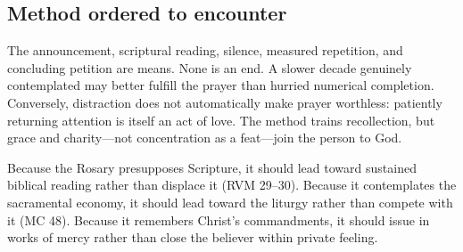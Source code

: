\subsection{Method ordered to encounter}

The announcement, scriptural reading, silence, measured repetition, and concluding petition are means. None is an end. A slower decade genuinely contemplated may better fulfill the prayer than hurried numerical completion. Conversely, distraction does not automatically make prayer worthless: patiently returning attention is itself an act of love. The method trains recollection, but grace and charity---not concentration as a feat---join the person to God.

Because the Rosary presupposes Scripture, it should lead toward sustained biblical reading rather than displace it (RVM 29--30). Because it contemplates the sacramental economy, it should lead toward the liturgy rather than compete with it (MC 48). Because it remembers Christ's commandments, it should issue in works of mercy rather than close the believer within private feeling.
